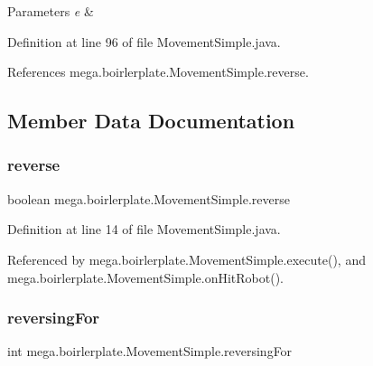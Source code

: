 \begin{DoxyParams}{Parameters}
{\em e} & \\
\hline
\end{DoxyParams}


Definition at line 96 of file Movement\+Simple.\+java.



References mega.\+boirlerplate.\+Movement\+Simple.\+reverse.



\subsection{Member Data Documentation}
\mbox{\label{classmega_1_1boirlerplate_1_1_movement_simple_a83693e62de05f2b134880d881bd1cca6}} 
\subsubsection{\texorpdfstring{reverse}{reverse}}
{\footnotesize\ttfamily boolean mega.\+boirlerplate.\+Movement\+Simple.\+reverse\hspace{0.3cm}{\ttfamily [private]}}



Definition at line 14 of file Movement\+Simple.\+java.



Referenced by mega.\+boirlerplate.\+Movement\+Simple.\+execute(), and mega.\+boirlerplate.\+Movement\+Simple.\+on\+Hit\+Robot().

\mbox{\label{classmega_1_1boirlerplate_1_1_movement_simple_ae4c33e8b8021545f204284ccc258888e}} 
\subsubsection{\texorpdfstring{reversing\+For}{reversingFor}}
{\footnotesize\ttfamily int mega.\+boirlerplate.\+Movement\+Simple.\+reversing\+For\hspace{0.3cm}{\ttfamily [private]}}



